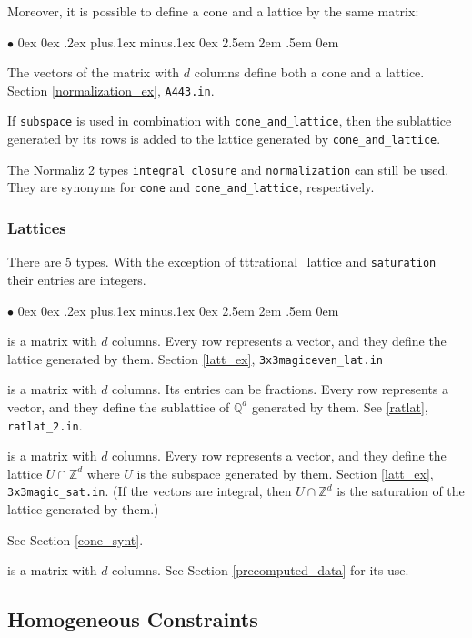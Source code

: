 \documentclass[12pt,a4paper]{scrartcl}
\newcommand{\stdli}{ \topsep0ex \partopsep0ex %
\parsep.2ex plus.1ex minus.1ex \itemsep0ex%
\leftmargin2.5em \labelwidth2em \labelsep.5em \rightmargin0em}%
\renewenvironment{itemize}{\begin{list}{{$\bullet$}}{\stdli}}{\end{list}}
\theoremstyle{definition}
\def\ZZ{{\mathbb Z}}
\def\QQ{{\mathbb Q}}
\def\itemtt[#1]{\item[\textbf{\ttt{#1}}]}
\def\ttt{\texttt}
\begin{document}
Moreover, it is possible to define a cone and a lattice by the same matrix:

\begin{itemize}
	\itemtt[cone\_and\_lattice] The vectors of the matrix with $d$ columns define both a cone and a lattice. Section \ref{normalization_ex}, \verb|A443.in|.
	
	If \verb|subspace| is used in combination with \verb|cone_and_lattice|, then the sublattice generated by its rows is added to the lattice generated by \verb|cone_and_lattice|.
\end{itemize}


The Normaliz 2 types \verb|integral_closure| and \verb|normalization| can still be used. They are synonyms for \verb|cone| and \verb|cone_and_lattice|, respectively.

\subsubsection{Lattices}

There are $5$ types. With the exception of ttt{rational\_lattice} and \ttt{saturation} their entries are integers.

\begin{itemize}
	\itemtt[lattice] is a matrix with $d$ columns. Every row represents a vector, and they define the lattice generated by them. Section \ref{latt_ex}, \verb|3x3magiceven_lat.in|
	
	\itemtt[rational\_lattice] is a matrix with $d$ columns. Its entries can be fractions.  Every row represents a vector, and they define the sublattice of $\QQ^d$  generated by them. See \ref{ratlat}, \verb|ratlat_2.in|.
	
	\itemtt[saturation] is a matrix with $d$ columns. Every row represents a vector, and they define the  lattice $U\cap \ZZ^d$ where $U$ is the subspace generated by them. Section \ref{latt_ex}, \verb|3x3magic_sat.in|. (If the vectors are integral, then $U\cap \ZZ^d$ is the saturation of the lattice generated by them.)
	
	\itemtt[cone\_and\_lattice] See Section \ref{cone_synt}.
	
	\itemtt[generated\_lattice] is a matrix with $d$ columns. See Section \ref{precomputed_data} for its use.
\end{itemize}


\subsection{Homogeneous Constraints}
\end{document}
